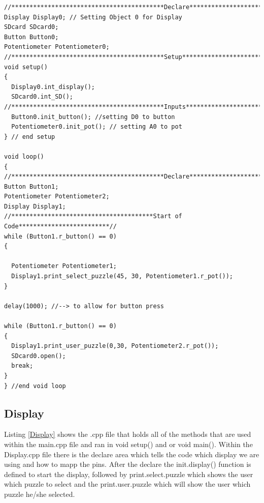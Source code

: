 \documentclass[11pt]{article}
\begin{document}
\begin{lstlisting}[caption={Puzzle me Chess - main.cpp file},label={main}]
//******************************************Declare****************************//
Display Display0; // Setting Object 0 for Display
SDcard SDcard0; 
Button Button0;
Potentiometer Potentiometer0; 
//******************************************Setup******************************//
void setup()
{
  Display0.int_display();
  SDcard0.int_SD();
//******************************************Inputs*****************************//
  Button0.init_button(); //setting D0 to button
  Potentiometer0.init_pot(); // setting A0 to pot
} // end setup

void loop()
{
//******************************************Declare****************************//
Button Button1;
Potentiometer Potentiometer2;
Display Display1;
//***************************************Start of Code*************************//
while (Button1.r_button() == 0)
{
  
  Potentiometer Potentiometer1; 
  Display1.print_select_puzzle(45, 30, Potentiometer1.r_pot());
}

delay(1000); //--> to allow for button press

while (Button1.r_button() == 0)
{
  Display1.print_user_puzzle(0,30, Potentiometer2.r_pot());
  SDcard0.open();
  break;
}
} //end void loop

\end{lstlisting}

\subsection{Display}
Listing \ref{Display} shows the .cpp file that holds all of the methods that are used within the main.cpp file and ran in void setup() and or void main(). Within the Display.cpp file there is the declare area which tells the code which display we are using and how to mapp the pins. After the declare the init.display() function is defined to start the display, followed by print.select.puzzle which shows the user which puzzle to select and the print.user.puzzle which will show the user which puzzle he/she selected. 
\end{document}
